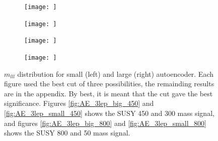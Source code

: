 \begin{figure}[H]
    \centering
    \begin{subfigure}{.45\textwidth}
        \texttt{[image: ]}
        \caption{ }
        \label{fig:AE_3lep_big_450_cut_mlll}
    \end{subfigure}
    \hfill
    \begin{subfigure}{.45\textwidth}
        \texttt{[image: ]}
        \caption{}
        \label{fig:AE_3lep_small_450_cut_mlll}
    \end{subfigure}
    \hfill
    \begin{subfigure}{.45\textwidth}
        \texttt{[image: ]}
        \caption{}
        \label{fig:AE_3lep_big_800_cut_mlll}
    \end{subfigure}
    \hfill   
    \begin{subfigure}{.45\textwidth}
        \texttt{[image: ]}
        \caption{}
        \label{fig:AE_3lep_small_800_cut_mlll}
    \end{subfigure}
    \hfill      
    \caption[$m_{lll}$ best cuts for regular autoencoder]{$m_{lll}$ distribution for small (left) and large (right) autoencoder.
    Each figure used the best cut of three possibilities, the remainding results are in the appendix. By best, it is meant that the cut
    gave the best significance. Figures \ref{fig:AE_3lep_big_450} and \ref{fig:AE_3lep_small_450} shows the SUSY 450 and 300 mass signal, 
    and figures \ref{fig:AE_3lep_big_800} and \ref{fig:AE_3lep_small_800} shows the SUSY 800 and 50 mass signal.}
    \label{fig:AE_3lep_recon_err_both_sig_cut_mlll}
\end{figure}



